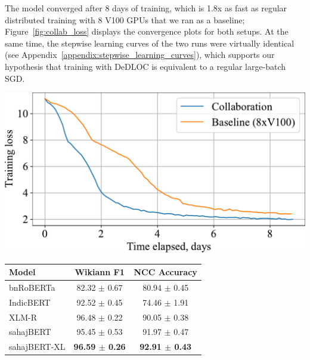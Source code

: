 The model converged after 8 days of training, which is 1.8x as fast as regular distributed training with 8 V100 GPUs that we ran as a baseline; Figure~\ref{fig:collab_loss} displays the convergence plots for both setups. At the same time, the stepwise learning curves of the two runs were virtually identical (see Appendix~\ref{appendix:stepwise_learning_curves}), which supports our hypothesis that training with DeDLOC is equivalent to a regular large-batch SGD.
 
\vspace{2pt}
\begin{minipage}[b]{0.49\textwidth}
\centering
\includegraphics[width=0.95\linewidth]{resources/loss_collab_bengali.pdf}
\vspace{-4pt}
\label{fig:collab_loss}
\end{minipage}
\begin{minipage}[b]{0.5\textwidth}
\setlength{\tabcolsep}{2pt}
\renewcommand{\arraystretch}{1.2}
\begin{tabular}{lcc}
\toprule
Model  & Wikiann F1 &NCC Accuracy \\
\midrule
bnRoBERTa           & 82.32 $\pm$ 0.67 &  80.94 $\pm$ 0.45 \\
IndicBERT           & 92.52 $\pm$ 0.45 &  74.46 $\pm$ 1.91 \\
XLM-R               & 96.48 $\pm$ 0.22 &  90.05 $\pm$ 0.38 \\
\midrule
sahajBERT           & 95.45 $\pm$ 0.53 &  91.97 $\pm$ 0.47 \\
sahajBERT-XL        & \bf 96.59 $\pm$ 0.26 & \bf 92.91 $\pm$ 0.43 \\
\bottomrule
\end{tabular}
\label{tab:downstream}
\end{minipage}

